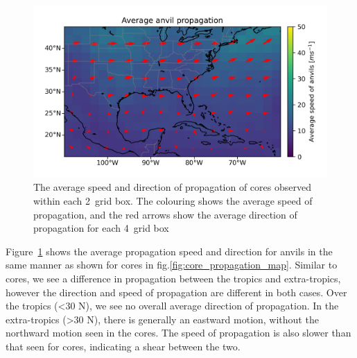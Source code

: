 \begin{figure}[tp]
    \centering
    \includegraphics[width=\textwidth]{figures/chapter2_18.png}
    \caption[
    The average speed and direction of propagation of anvils
    ]{
    The average speed and direction of propagation of cores observed within each 2\textdegree\ grid box. The colouring shows the average speed of propagation, and the red arrows show the average direction of propagation for each 4\textdegree\ grid box
    }
    \label{fig:anvil_propagation_map}
\end{figure}

Figure~\ref{fig:anvil_propagation_map} shows the average propagation speed and direction for anvils in the same manner as shown for cores in fig.\ref{fig:core_propagation_map}.
Similar to cores, we see a difference in propagation between the tropics and extra-tropics, however the direction and speed of propagation are different in both cases.
Over the tropics (\textless30\,\textdegree\,N), we see no overall average direction of propagation.
In the extra-tropics (\textgreater30\,\textdegree\,N), there is generally an eastward motion, without the northward motion seen in the cores.
The speed of propagation is also slower than that seen for cores, indicating a shear between the two.

